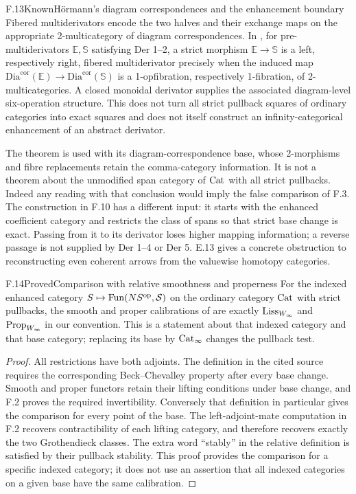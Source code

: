 \begin{claim}{F.13}{Known}{H\"ormann's diagram correspondences and the enhancement boundary}
Fibered multiderivators encode the two halves and their exchange maps on the appropriate 2-multicategory of diagram correspondences. In \citet[Theorem 6.12]{EFHormann2017}, for pre-multiderivators $\mathbb E,\mathbb S$ satisfying Der 1--2, a strict morphism $\mathbb E\to\mathbb S$ is a left, respectively right, fibered multiderivator precisely when the induced map $\mathrm{Dia}^{\mathrm{cor}}(\mathbb E)\to\mathrm{Dia}^{\mathrm{cor}}(\mathbb S)$ is a 1-opfibration, respectively 1-fibration, of 2-multicategories. A closed monoidal derivator supplies the associated diagram-level six-operation structure. This does not turn all strict pullback squares of ordinary categories into exact squares and does not itself construct an infinity-categorical enhancement of an abstract derivator.
\end{claim}
The theorem is used with its diagram-correspondence base, whose 2-morphisms and fibre replacements retain the comma-category information. It is not a theorem about the unmodified span category of $\mathrm{Cat}$ with all strict pullbacks. Indeed any reading with that conclusion would imply the false comparison of F.3. The construction in F.10 has a different input: it starts with the enhanced coefficient category and restricts the class of spans so that strict base change is exact. Passing from it to its derivator loses higher mapping information; a reverse passage is not supplied by Der 1--4 or Der 5. E.13 gives a concrete obstruction to reconstructing even coherent arrows from the valuewise homotopy categories.

\begin{claim}{F.14}{Proved}{Comparison with relative smoothness and properness}
For the indexed enhanced category $S\mapsto\mathrm{Fun}(NS^{\mathrm{op}},\mathcal S)$ on the ordinary category $\mathrm{Cat}$ with strict pullbacks, the smooth and proper calibrations of \citet[Definition 2.3.1]{EFAnelWeinberger2025} are exactly $\mathrm{Liss}_{W_\infty}$ and $\mathrm{Prop}_{W_\infty}$ in our convention. This is a statement about that indexed category and that base category; replacing its base by $\mathrm{Cat}_\infty$ changes the pullback test.
\end{claim}
\begin{proof}
All restrictions have both adjoints. The definition in the cited source requires the corresponding Beck--Chevalley property after every base change. Smooth and proper functors retain their lifting conditions under base change, and F.2 proves the required invertibility. Conversely that definition in particular gives the comparison for every point of the base. The left-adjoint-mate computation in F.2 recovers contractibility of each lifting category, and therefore recovers exactly the two Grothendieck classes. The extra word ``stably'' in the relative definition is satisfied by their pullback stability. This proof provides the comparison for a specific indexed category; it does not use an assertion that all indexed categories on a given base have the same calibration.
\end{proof}


